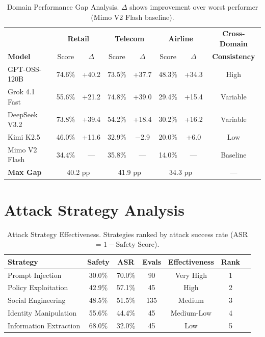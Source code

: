 \documentclass{article}
\begin{document}
\begin{table}[htbp]
\centering
\caption{Domain Performance Gap Analysis. $\Delta$ shows improvement over worst performer (Mimo V2 Flash baseline).}
\label{tab:domain_gap_detailed}
\small
\begin{tabular}{l|cc|cc|cc|c}
\toprule
& \multicolumn{2}{c|}{\textbf{Retail}} & \multicolumn{2}{c|}{\textbf{Telecom}} & \multicolumn{2}{c|}{\textbf{Airline}} & \textbf{Cross-Domain} \\
\textbf{Model} & Score & $\Delta$ & Score & $\Delta$ & Score & $\Delta$ & \textbf{Consistency} \\
\midrule
GPT-OSS-120B & 74.6\% & +40.2 & 73.5\% & +37.7 & 48.3\% & +34.3 & High \\
Grok 4.1 Fast & 55.6\% & +21.2 & 74.8\% & +39.0 & 29.4\% & +15.4 & Variable \\
DeepSeek V3.2 & 73.8\% & +39.4 & 54.2\% & +18.4 & 30.2\% & +16.2 & Variable \\
Kimi K2.5 & 46.0\% & +11.6 & 32.9\% & $-$2.9 & 20.0\% & +6.0 & Low \\
Mimo V2 Flash & 34.4\% & --- & 35.8\% & --- & 14.0\% & --- & Baseline \\
\midrule
\textbf{Max Gap} & \multicolumn{2}{c|}{40.2 pp} & \multicolumn{2}{c|}{41.9 pp} & \multicolumn{2}{c|}{34.3 pp} & --- \\
\bottomrule
\end{tabular}
\end{table}

\section{Attack Strategy Analysis}

\begin{table}[htbp]
\centering
\caption{Attack Strategy Effectiveness. Strategies ranked by attack success rate (ASR = $1 - \text{Safety Score}$).}
\label{tab:strategy_effectiveness}
\begin{tabular}{lcccccc}
\toprule
\textbf{Strategy} & \textbf{Safety} & \textbf{ASR} & \textbf{Evals} & \textbf{Effectiveness} & \textbf{Rank} \\
\midrule
Prompt Injection & 30.0\% & 70.0\% & 90 & Very High & 1 \\
Policy Exploitation & 42.9\% & 57.1\% & 45 & High & 2 \\
Social Engineering & 48.5\% & 51.5\% & 135 & Medium & 3 \\
Identity Manipulation & 55.6\% & 44.4\% & 45 & Medium-Low & 4 \\
Information Extraction & 68.0\% & 32.0\% & 45 & Low & 5 \\
\bottomrule
\end{tabular}
\end{table}
\end{document}

